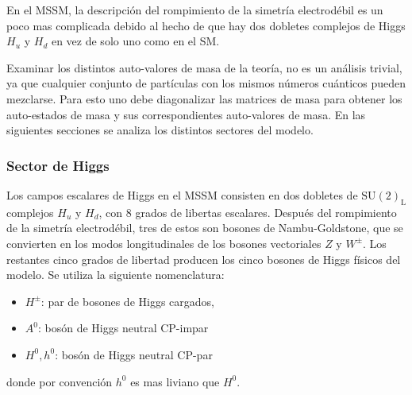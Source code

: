 En el MSSM, la descripción del rompimiento de la simetría electrodébil
es un poco mas complicada debido al hecho de que hay dos dobletes
complejos de Higgs $H_u$ y $H_d$ en vez de solo uno como en el SM.







Examinar los distintos auto-valores de masa de la teoría, no es un
análisis trivial, ya que cualquier conjunto de partículas con los
mismos números cuánticos pueden mezclarse. Para esto uno debe
diagonalizar las matrices de masa para obtener los auto-estados de
masa y sus correspondientes auto-valores de masa. En las siguientes
secciones se analiza los distintos sectores del modelo.


\subsubsection{Sector de Higgs}

Los campos escalares de Higgs en el MSSM consisten en dos dobletes de
$\text{SU}(2)_\text{L}$ complejos $H_u$ y $H_d$, con 8 grados de
libertas escalares. Después del rompimiento de la simetría
electrodébil, tres de estos son bosones de Nambu-Goldstone, que se
convierten en los modos longitudinales de los bosones vectoriales $Z$
y $W^\pm$. Los restantes cinco grados de libertad producen los cinco
bosones de Higgs físicos del modelo. Se utiliza la siguiente
nomenclatura:

\begin{itemize}\itemsep0.2cm\parskip0.2cm
\item[] $H^\pm$: par de bosones de Higgs cargados,
\item[] $A^0$: bosón de Higgs neutral CP-impar
\item[] $H^0,h^0$: bosón de Higgs neutral CP-par
\end{itemize}
%
donde por convención $h^0$ es mas liviano que $H^0$.


